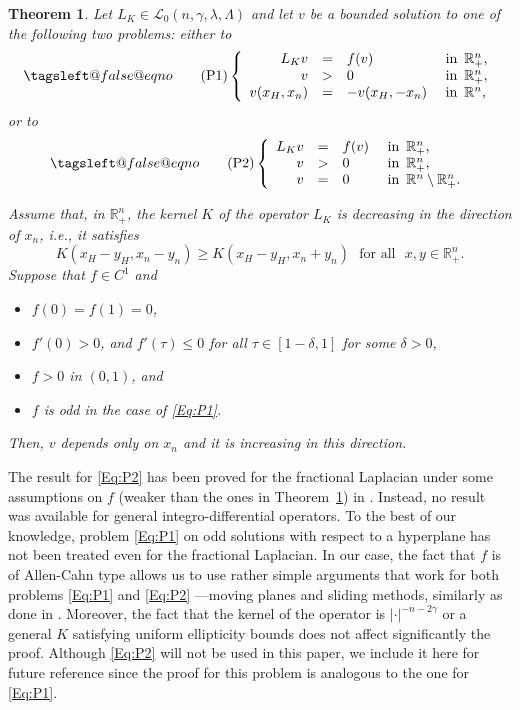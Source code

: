 \documentclass[12pt,reqno]{amsart}
\makeatletter
\newtheorem{theorem}{Theorem}[section]
\theoremstyle{definition}
\theoremstyle{remark}
\newcommand{\con}[1]{\mathbb{#1}}
\newcommand{\R}{\con{R}} %
\newcommand{\lcal}{\mathcal{L}}
\newcommand{\reqnomode}{\tagsleft@false\let\veqno\@@eqno}
\newcommand{\s}{\gamma}
\newcommand\beqc[1]{\left\{\begin{array}{#1}}
\newcommand\eeqc{\end{array} \right.}
\def\PDEsystem{rcll}
\numberwithin{equation}{section}
\makeatother
\begin{document}
\begin{theorem}
	\label{Th:SymmHalfSpace}
	Let $L_K\in \lcal_0(n,\s,\lambda, \Lambda)$ and let $v$ be a bounded solution to one of the following two problems: either to	
	\begin{equation}
	\reqnomode
	\tag{P1}
	\label{Eq:P1}
	\beqc{\PDEsystem}
	L_K v &=& f(v)   &\textrm{ in } \,\R^n_+,\\
	v &>& 0   &\textrm{ in } \,\R^n_+,\\
	v(x_H,x_n) &=& -v(x_H,-x_n)   &\textrm{ in } \,\R^n,
	\eeqc
	\end{equation}
	or to
	\begin{equation}
	\reqnomode
	\tag{P2}
	\label{Eq:P2}
	\beqc{\PDEsystem}
	L_K v &=& f(v)   &\textrm{ in } \,\R^n_+,\\
	v &>& 0   &\textrm{ in } \,\R^n_+,\\
	v &=& 0   &\textrm{ in } \,\R^n \setminus \R^n_+.
	\eeqc
	\end{equation}
	
	\reqnomode
	
	Assume that, in $\R^n_+$, the kernel $K$ of the operator $L_K$ is decreasing in the direction of $x_n$, i.e., it satisfies
	$$
	K(x_H-y_H,x_n-y_n) \geq K(x_H-y_H,x_n+y_n) \,\,\,\,\text{for all } \,\, x,y\in \R^n_+.
	$$ 
	Suppose that $f\in C^1$ and
	\begin{itemize}
		\item $f(0) = f(1) = 0$,
		\item $f'(0)>0$, and $f'(\tau)\leq 0$ for all $\tau\in[1-\delta,1]$ for some $\delta>0$,
		\item $f>0$ in $(0,1)$, and
		\item $f$ is odd in the case of \eqref{Eq:P1}.
	\end{itemize}
	Then, $v$ depends only on $x_n$ and it is increasing in this direction.
\end{theorem}

The result for \eqref{Eq:P2} has been proved for the fractional Laplacian under some assumptions on $f$ (weaker than the ones in Theorem~\ref{Th:SymmHalfSpace}) in \cite{QuaasXia, DipierroSoaveValdinoci, BarriosEtAl-Monotonicity, BarriosEtAl-Symmetry, FallWethMonotonicity}. Instead, no result was available for general integro-differential operators. To the best of our knowledge, problem \eqref{Eq:P1} on odd solutions with respect to a hyperplane has not been treated even for the fractional Laplacian. In our case, the fact that $f$ is of Allen-Cahn type allows us to use rather simple arguments that work for both problems \eqref{Eq:P1} and \eqref{Eq:P2} ---moving planes and sliding methods, similarly as done in \cite{DipierroSoaveValdinoci}. Moreover, the fact that the kernel of the operator is $|\cdot|^{-n-2\s}$ or a general $K$ satisfying uniform ellipticity bounds does not affect significantly the proof.  Although \eqref{Eq:P2} will not be used in this paper, we include it here for future reference since the proof for this problem is analogous to the one for \eqref{Eq:P1}. 
\end{document}
